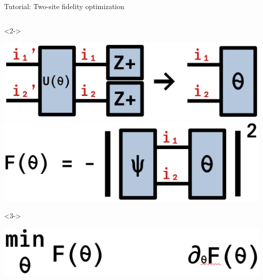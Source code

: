 \begin{frame}[fragile]{Tutorial: Two-site fidelity optimization}
\begin{columns}
\begin{column}{5cm}
\begin{onlyenv}<2->
\vspace*{0.0cm}
\begin{center}
\includegraphics[width=1.0\textwidth]{
  slides/assets/UZp1Zp2.png
} \\
\includegraphics[width=1.0\textwidth]{
  slides/assets/psi12theta12.png
}
\end{center}
\vspace*{0.0cm}
\end{onlyenv}

\begin{onlyenv}<3->
\vspace*{0.0cm}
\begin{center}
\includegraphics[width=1.0\textwidth]{
  slides/assets/min_grad_F_theta.png
}
\end{center}
\vspace*{0.0cm}
\end{onlyenv}


\end{column}

\end{columns}

\end{frame}
